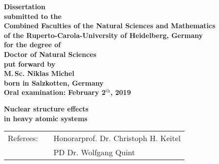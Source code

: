 
\begin{titlepage}
\begin{center}
  \renewcommand{\baselinestretch}{1.50}
  \normalsize\bfseries%
  Dissertation\\
  submitted to the\\
  Combined Faculties of the Natural Sciences and Mathematics\\
  of the Ruperto-Carola-University of Heidelberg, Germany\\
  for the degree of\\
  Doctor of Natural Sciences\\
  \vfill
  put forward by\\
  \vspace{0.5\baselineskip}
  {\Large M.$\,$Sc. Niklas Michel} \\
  \vspace{0.5\baselineskip}
  born in Salzkotten, Germany\\
  Oral examination: February 2$^{\textrm{th}}$, 2019
\end{center}
\end{titlepage}





\begin{titlepage}
\begin{center}
  \renewcommand{\baselinestretch}{1.50}
  \vspace*{1.5\baselineskip}
  \bfseries
  {\Huge Nuclear structure effects}\\%
   \vspace{0.7\baselineskip} {\Huge in heavy atomic systems}
  \vfill
  \large%
  \begin{tabular}{lp{0.5cm}l}
  Referees: && Honorarprof. Dr. Christoph H. Keitel\\
  && PD Dr. Wolfgang Quint
  \end{tabular}
\end{center}
\end{titlepage}

\renewcommand{\baselinestretch}{1.00}\normalsize


